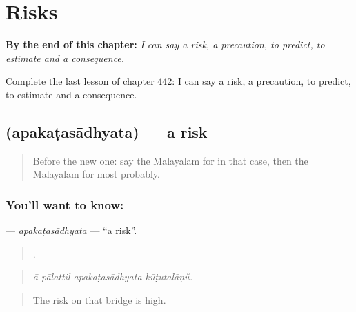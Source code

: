 
\chapter{Risks}
\label{ch:ml-risks}

\begin{chapteropening}
\textbf{By the end of this chapter:} \emph{I can say a risk, a precaution, to predict, to estimate and a consequence.}

Complete the last lesson of chapter 442: I can say a risk, a precaution, to predict, to estimate and a consequence.
\end{chapteropening}

\section[\texorpdfstring{\ml{അപകടസാധ്യത} (apakaṭasādhyata)}{അപകടസാധ്യത (apakaṭasādhyata)}]{ (apakaṭasādhyata) — a risk}

\label{lesson:ML-C442-apakatasadhyata}



\begin{quote}
Before the new one: say the Malayalam for in that case, then the Malayalam for most probably.
\end{quote}

\subsection*{You'll want to know: }
\textbf{} — \emph{apakaṭasādhyata} — \textquotedblleft{}a risk\textquotedblright{}.

\begin{quote}
   .
\end{quote}

\begin{quote}
\emph{ā pālattil apakaṭasādhyata kūṭutalāṇŭ.}
\end{quote}

\begin{quote}
The risk on that bridge is high.
\end{quote}


